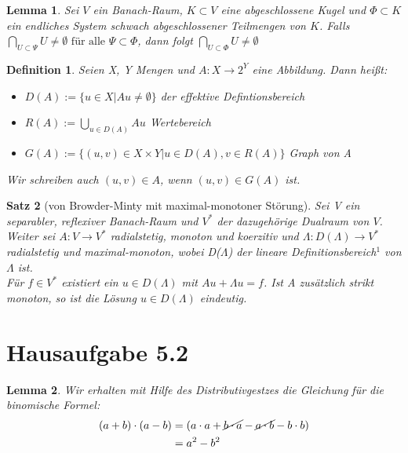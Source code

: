 \documentclass[a4paper]{article}
\newcommand{\V}{V^{\ast}}
\newtheorem{lemma}{Lemma}[section]
\newtheorem{satz}{Satz}[subsection]
\newtheorem{definition}[satz]{Definition}
\begin{document}
\begin{lemma}
Sei $V$ ein Banach-Raum, $K \subset V$ eine abgeschlossene Kugel und $\Phi \subset K$ ein endliches System schwach abgeschlossener Teilmengen von $K$. Falls $\bigcap\limits_{U \subset \Psi} U \neq \emptyset \text{ für alle } \Psi \subset \Phi$, dann folgt $\bigcap\limits_{U \subset \Phi} U \neq \emptyset$ 
\end{lemma}

\begin{definition} 
Seien X, Y Mengen und $ A \colon X \to 2^Y $ eine Abbildung. Dann heißt:
\begin{itemize}
\item[i)] $ D(A)  := \{u \in X \vert Au \neq \emptyset \} $ der effektive Defintionsbereich
\item[ii)] $ R(A)  := \bigcup\limits_{u \in D(A)}^{} Au $ Wertebereich
\item[iii)] $ G(A)  := \{ ( u,v ) \in X \times Y \vert u \in D(A), v \in R(A) \} $ Graph von A 
\end{itemize}
Wir schreiben auch $ (u,v) \in A$, wenn $ (u,v) \in G(A)$ ist.
\end{definition}

\begin{satz}[von Browder-Minty mit maximal-monotoner Störung]
Sei V ein separabler, reflexiver Banach-Raum und $\V$ der dazugehörige Dualraum von $V$. Weiter sei $A \colon V \to V^{\ast}$ radialstetig, monoton und koerzitiv und $\Lambda \colon D(\Lambda) \to V^{\ast}$ radialstetig und maximal-monoton, wobei D($\Lambda$) der lineare Definitionsbereich$^1$ von $\Lambda$ ist. \\
Für $f \in V^{\ast}$ existiert ein $u \in D(\Lambda) $ mit $Au + \Lambda u = f$. Ist A zusätzlich strikt monoton, so ist die Lösung $u \in D(\Lambda)$ eindeutig. 
\end{satz} 

\newpage

\section{Hausaufgabe 5.2}
\begin{lemma} 
Wir erhalten mit Hilfe des Distributivgestzes die Gleichung für die binomische Formel: 
\begin{align*}
(a + b) \cdot (a - b) &= (a \cdot a + \cancel{ b \cdot a } - \cancel { a \cdot b } - b \cdot b) \\
&= a^2 - b^2
\end{align*} 
\end{lemma}
\end{document}
